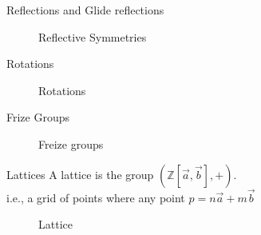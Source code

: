 \documentclass{beamer}
\begin{document}
\begin{frame}{Reflections and Glide reflections}
    \begin{figure}
        \centering
        
        \caption{Reflective Symmetries}
        \label{fig:symmetries}
    \end{figure}
\end{frame}

\begin{frame}{Rotations}
    \begin{figure}
        \centering
        
        \caption{Rotations}
        \label{fig:enter-label}
    \end{figure}
\end{frame}

\begin{frame}{Frize Groups}
    \begin{figure}
        \centering
        
        \caption{Freize groups}
        \label{fig:Freize}
    \end{figure}
\end{frame}

\begin{frame}{Lattices}
        A lattice is the group $(\mathbb{Z}[\Vec{a},\Vec{b}],+).$\\
        i.e., a grid of points where any point $p = n\Vec{a} +m\Vec{b}$ 
    \begin{figure}
        \centering
        \scalebox{0.5}{}
        \caption{Lattice}
        \label{fig:enter-label}
    \end{figure}
\end{frame}
\end{document}
